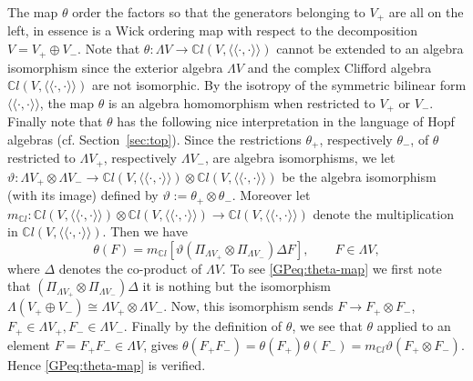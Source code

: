 \documentclass{article}
\newcommand{\assign}{:=}
\newcommand{\cdummy}{\cdot}
\newcommand{\llangle}{{\langle\!\langle}}
\newcommand{\rrangle}{{\rangle\!\rangle}}
\begin{document}
\begin{remark}
  \label{GPrem:theta-map}The map $\theta$ order the factors so that the
  generators belonging to $V_+$ are all on the left, in essence is a Wick
  ordering map with respect to the decomposition $V = V_+ \oplus V_-$. Note
  that $\theta : \Lambda V \rightarrow \mathbb{C}l (V, \llangle \cdummy,
  \cdummy \rrangle)$ cannot be extended to an algebra isomorphism since the
  exterior algebra $\Lambda V$ and the complex Clifford algebra $\mathbb{C}l
  (V, \llangle \cdummy, \cdummy \rrangle)$ are not isomorphic. By the isotropy
  of the symmetric bilinear form $\llangle \cdummy, \cdummy \rrangle$, the map
  $\theta$ is an algebra homomorphism when restricted to $V_+$ or $V_-$.
  Finally note that $\theta$ has the following nice interpretation in the
  language of Hopf algebras (cf. Section~\ref{sec:top}). Since the
  restrictions $\theta_+$, respectively $\theta_-$, of $\theta$ restricted to
  $\Lambda V_+$, respectively $\Lambda V_-$, are algebra isomorphisms, we let
  $\vartheta : \Lambda V_+ \otimes \Lambda V_- \rightarrow \mathbb{C}l (V,
  \llangle \cdummy, \cdummy \rrangle) \otimes \mathbb{C}l (V, \llangle
  \cdummy, \cdummy \rrangle)$ be the algebra isomorphism (with its image)
  defined by $\vartheta \assign \theta_+ \otimes \theta_-$. Moreover let
  $m_{\mathbb{C}l} : \mathbb{C}l (V, \llangle \cdummy, \cdummy \rrangle)
  \otimes \mathbb{C}l (V, \llangle \cdummy, \cdummy \rrangle) \rightarrow
  \mathbb{C}l (V, \llangle \cdummy, \cdummy \rrangle)$ denote the
  multiplication in $\mathbb{C}l (V, \llangle \cdummy, \cdummy \rrangle)$.
  Then we have
  \begin{equation}
    \theta (F) = m_{\mathbb{C}l} [\vartheta (\Pi_{\Lambda V_+} \otimes
    \Pi_{\Lambda V_-}) \Delta F], \qquad F \in \Lambda V,
    \label{GPeq:theta-map}
  \end{equation}
  where $\Delta$ denotes the co-product of $\Lambda V$. To see
  {\eqref{GPeq:theta-map}} we first note that $(\Pi_{\Lambda V_+} \otimes
  \Pi_{\Lambda V_-}) \Delta$ it is nothing but the isomorphism $\Lambda (V_+
  \oplus V_-) \cong \Lambda V_+ \otimes \Lambda V_-$. Now, this isomorphism
  sends $F \rightarrow F_+ \otimes F_-$, $F_+ \in \Lambda V_+, F_- \in \Lambda
  V_-$. Finally by the definition of $\theta$, we see that $\theta$ applied to
  an element $F = F_+ F_- \in \Lambda V$, gives $\theta (F_+ F_-) = \theta
  (F_+) \theta (F_-) = m_{\mathbb{C}l} \vartheta (F_+ \otimes F_-)$. Hence
  {\eqref{GPeq:theta-map}} is verified.
\end{remark}
\end{document}
